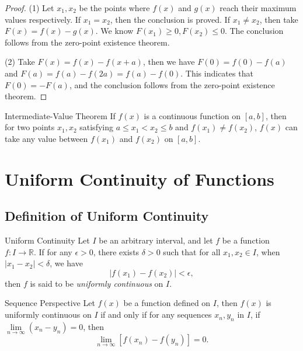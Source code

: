 \begin{proof}
  (1) Let $x_1, x_2$ be the points where $f(x)$ and $g(x)$ reach their maximum
  values respectively. If $x_1 = x_2$, then the conclusion is proved.
  If $x_1 \neq x_2$, then take $F(x) = f(x) - g(x)$. We know $F(x_1) \geq 0,
  F(x_2) \leq 0$. The conclusion follows from the zero-point existence theorem.

  (2) Take $F(x) = f(x) - f(x+a)$, then we have $F(0) = f(0) - f(a)$ and $F(a) =
  f(a) - f(2a) = f(a) - f(0)$.
  This indicates that $F(0) = -F(a)$, and the conclusion follows from the
  zero-point existence theorem.
\end{proof}

\begin{theorem}{Intermediate-Value Theorem}{}
  If $f(x)$ is a continuous function on $[a, b]$,
  then for two points $x_1, x_2$ satisfying $a \leq x_1 < x_2 \leq b$ and
  $f(x_1) \neq f(x_2)$,
  $f(x)$ can take any value between $f(x_1)$ and $f(x_2)$ on $[a, b]$.
\end{theorem}


\section{Uniform Continuity of Functions}

\subsection{Definition of Uniform Continuity}

\begin{definition}{Uniform Continuity}{}
  Let $I$ be an arbitrary interval,
  and let $f$ be a function $f: I \rightarrow \mathbb{R}$.
  If for any $\epsilon > 0$, there exists $\delta > 0$ such that for all $x_1,
  x_2 \in I$, when $|x_1 - x_2| < \delta$, we have
  \begin{equation}
    |f(x_1) - f(x_2)| < \epsilon,
  \end{equation}
  then $f$ is said to be \emph{uniformly continuous} on $I$.
\end{definition}

\begin{proposition}{Sequence Perspective}{}
  Let $f(x)$ be a function defined on $I$,
  then $f(x)$ is uniformly continuous on $I$ if and only if
  for any sequences $x_n, y_n$ in $I$,
  if $\lim \limits _{n \rightarrow \infty} (x_n - y_n) = 0$,
  then
  \begin{equation}
    \lim \limits _{n \rightarrow \infty} \left[ f(x_n) - f(y_n) \right] = 0.
  \end{equation}
\end{proposition}


